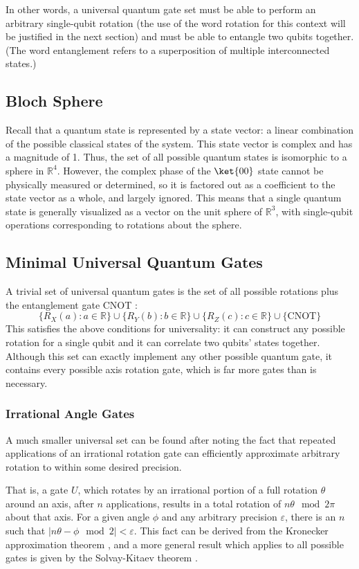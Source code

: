 \documentclass[12pt]{article}
\begin{document}
In other words, a universal quantum gate set must be able to perform an arbitrary single-qubit rotation (the use of the word rotation for this context will be justified in the next section) and must be able to entangle two qubits together. (The word entanglement refers to a superposition of multiple interconnected states.)

\subsection{Bloch Sphere}
Recall that a quantum state is represented by a state vector: a linear combination of the possible classical states of the system. This state vector is complex and has a magnitude of 1. Thus, the set of all possible quantum states is isomorphic to a sphere in $\mathbb{R}^4$. However, the complex phase of the  $\ket{00}$ state cannot be physically measured or determined, so it is factored out as a coefficient to the state vector as a whole, and largely ignored. This means that a single quantum state is generally visualized as a vector on the unit sphere of $\mathbb{R}^3$, with single-qubit operations corresponding to rotations about the sphere.

\subsection{Minimal Universal Quantum Gates}
A trivial set of universal quantum gates is the set of all possible rotations plus the entanglement gate CNOT \cite{Boykin2000}:
$$\{R_X(a) : a \in \mathbb{R}\} \cup \{R_Y(b) : b \in \mathbb{R}\} \cup \{R_Z(c) : c \in \mathbb{R}\} \cup \{\text{CNOT}\}$$
This satisfies the above conditions for universality: it can construct any possible rotation for a single qubit and it can correlate two qubits' states together. Although this set can exactly implement any other possible quantum gate, it contains every possible axis rotation gate, which is far more gates than is necessary.

\subsubsection{Irrational Angle Gates}
A much smaller universal set can be found after noting the fact that repeated applications of an irrational rotation gate can efficiently approximate arbitrary rotation to within some desired precision.

That is, a gate $U$, which rotates by an irrational portion of a full rotation $\theta$ around an axis, after $n$ applications, results in a total rotation of $n \theta \mod 2 \pi$ about that axis. For a given angle $\phi$ and any arbitrary precision $\varepsilon$, there is an $n$ such that $|n \theta - \phi \mod 2| < \varepsilon$. This fact can be derived from the Kronecker approximation theorem \cite{Hlawka1986}, and a more general result which applies to all possible gates is given by the Solvay-Kitaev theorem \cite{Dawson2005}.
\end{document}
